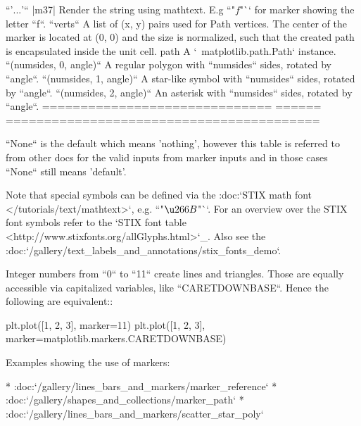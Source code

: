 \begin{DoxyVerb}
``'$...$'``                    |m37|  Render the string using mathtext.
                              E.g ``"$f$"`` for marker showing the
                              letter ``f``.
``verts``                             A list of (x, y) pairs used for Path
                              vertices. The center of the marker is
                              located at (0, 0) and the size is
                              normalized, such that the created path
                              is encapsulated inside the unit cell.
path                                  A `~matplotlib.path.Path` instance.
``(numsides, 0, angle)``              A regular polygon with ``numsides``
                              sides, rotated by ``angle``.
``(numsides, 1, angle)``              A star-like symbol with ``numsides``
                              sides, rotated by ``angle``.
``(numsides, 2, angle)``              An asterisk with ``numsides`` sides,
                              rotated by ``angle``.
============================== ====== =========================================

``None`` is the default which means 'nothing', however this table is
referred to from other docs for the valid inputs from marker inputs and in
those cases ``None`` still means 'default'.

Note that special symbols can be defined via the
:doc:`STIX math font </tutorials/text/mathtext>`,
e.g. ``"$\u266B$"``. For an overview over the STIX font symbols refer to the
`STIX font table <http://www.stixfonts.org/allGlyphs.html>`_.
Also see the :doc:`/gallery/text_labels_and_annotations/stix_fonts_demo`.

Integer numbers from ``0`` to ``11`` create lines and triangles. Those are
equally accessible via capitalized variables, like ``CARETDOWNBASE``.
Hence the following are equivalent::

    plt.plot([1, 2, 3], marker=11)
    plt.plot([1, 2, 3], marker=matplotlib.markers.CARETDOWNBASE)

Examples showing the use of markers:

* :doc:`/gallery/lines_bars_and_markers/marker_reference`
* :doc:`/gallery/shapes_and_collections/marker_path`
* :doc:`/gallery/lines_bars_and_markers/scatter_star_poly`



\end{DoxyVerb}
